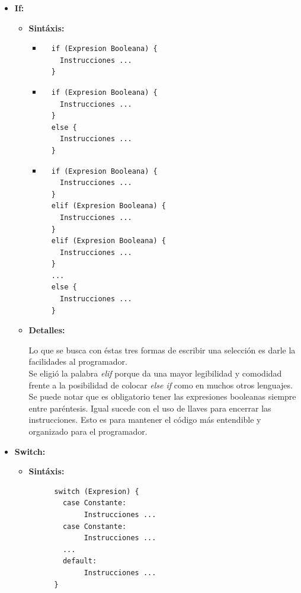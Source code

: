 \documentclass[11pt, spanish]{report}
\begin{document}
\begin{itemize}
\item \textbf{If:}
  \begin{itemize}    
  \item \textbf{Sint\'axis:}
    
    \begin{itemize}
    \item \begin{verbatim}
  if (Expresion Booleana) { 
    Instrucciones ... 
  } \end{verbatim}
    \item \begin{verbatim}
  if (Expresion Booleana) {
    Instrucciones ...
  }
  else {
    Instrucciones ...
  } \end{verbatim}
    \item \begin{verbatim}
  if (Expresion Booleana) {
    Instrucciones ...
  }
  elif (Expresion Booleana) {
    Instrucciones ...
  }
  elif (Expresion Booleana) {
    Instrucciones ...
  }
  ...
  else {
    Instrucciones ...
  } \end{verbatim}
    \end{itemize}
    
  \item \textbf{Detalles:}
    
    Lo que se busca con \'estas tres formas de escribir una selecci\'on es darle la facilidades al programador.\\
    
    Se eligi\'o la palabra \emph{elif} porque da una mayor legibilidad y comodidad frente a la posibilidad de colocar \emph{else if} como en muchos otros lenguajes. \\
    
    Se puede notar que es obligatorio tener las expresiones booleanas siempre entre par\'entesis. Igual sucede con el uso de llaves para encerrar las instrucciones. 
    Esto es para mantener el c\'odigo m\'as entendible y organizado para el programador.\\

  \end{itemize}
  
\item \textbf{Switch:}

  \begin{itemize}
  \item \textbf{Sint\'axis:}    
    \begin{verbatim}
      switch (Expresion) {
        case Constante:
             Instrucciones ...
        case Constante:
             Instrucciones ...
        ...
        default:
             Instrucciones ...
      }
    \end{verbatim}
  

\end{itemize}
\end{itemize}
\end{document}
